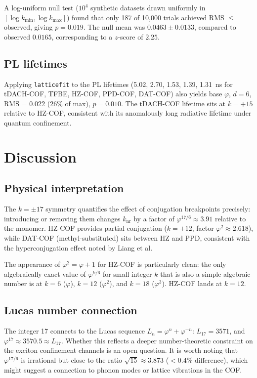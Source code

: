 ﻿\documentclass[11pt,a4paper]{article}
\begin{document}
A log-uniform null test ($10^4$ synthetic datasets drawn uniformly
in $[\log k_{\min}, \log k_{\max}]$) found that only 187 of 10,000
trials achieved RMS $\leq$ observed, giving $p = 0.019$.
The null mean was $0.0463 \pm 0.0133$, compared to observed
$0.0165$, corresponding to a $z$-score of $2.25$.

\subsection{PL lifetimes}

Applying \texttt{latticefit} to the PL lifetimes (5.02, 2.70, 1.53,
1.39, 1.31~ns for tDACH-COF, TFBE, HZ-COF, PPD-COF, DAT-COF)
also yields base $\varphi$, $d = 6$, RMS = 0.022 (26\% of max),
$p = 0.010$. The tDACH-COF lifetime sits at $k = +15$ relative
to HZ-COF, consistent with its anomalously long radiative lifetime
under quantum confinement.

\section{Discussion}

\subsection{Physical interpretation}

The $k = \pm 17$ symmetry quantifies the effect of conjugation
breakpoints precisely: introducing or removing them changes
$k_{\mathrm{nr}}$ by a factor of $\varphi^{17/6} \approx 3.91$
relative to the monomer. HZ-COF provides partial conjugation
($k = +12$, factor $\varphi^2 \approx 2.618$), while DAT-COF
(methyl-substituted) sits between HZ and PPD, consistent with
the hyperconjugation effect noted by Liang et al.

The appearance of $\varphi^2 = \varphi + 1$ for HZ-COF is
particularly clean: the only algebraically exact value of
$\varphi^{k/6}$ for small integer $k$ that is also a simple
algebraic number is at $k = 6$ ($\varphi$), $k = 12$ ($\varphi^2$),
and $k = 18$ ($\varphi^3$). HZ-COF lands at $k = 12$.

\subsection{Lucas number connection}

The integer 17 connects to the Lucas sequence
$L_n = \varphi^n + \varphi^{-n}$: $L_{17} = 3571$, and
$\varphi^{17} \approx 3570.5 \approx L_{17}$. Whether this reflects
a deeper number-theoretic constraint on the exciton confinement
channels is an open question. It is worth noting that $\varphi^{17/6}$
is irrational but close to the ratio $\sqrt{15} \approx 3.873$
($< 0.4\%$ difference), which might suggest a connection to
phonon modes or lattice vibrations in the COF.
\end{document}
